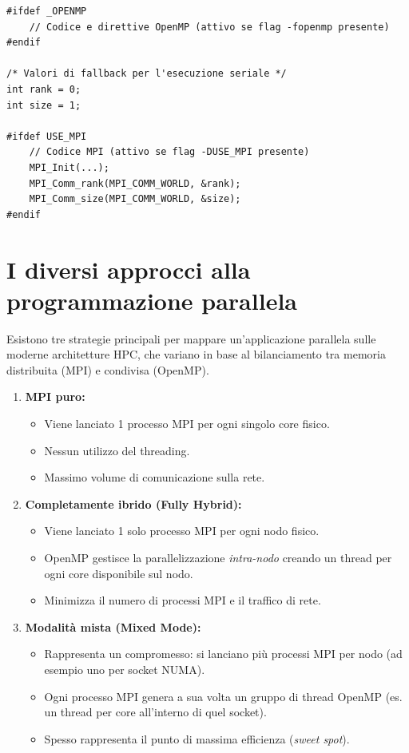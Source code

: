 \begin{verbatim}
#ifdef _OPENMP
    // Codice e direttive OpenMP (attivo se flag -fopenmp presente)
#endif

/* Valori di fallback per l'esecuzione seriale */
int rank = 0;
int size = 1;

#ifdef USE_MPI
    // Codice MPI (attivo se flag -DUSE_MPI presente)
    MPI_Init(...);
    MPI_Comm_rank(MPI_COMM_WORLD, &rank);
    MPI_Comm_size(MPI_COMM_WORLD, &size);
#endif
\end{verbatim}

\section*{I diversi approcci alla programmazione parallela}

Esistono tre strategie principali per mappare un'applicazione parallela sulle moderne architetture HPC, che variano in base al bilanciamento tra memoria distribuita (MPI) e condivisa (OpenMP).

\begin{enumerate}
    \item \textbf{MPI puro:} 
    \begin{itemize}
        \item Viene lanciato 1 processo MPI per ogni singolo core fisico.
        \item Nessun utilizzo del threading.
        \item Massimo volume di comunicazione sulla rete.
    \end{itemize}
    
    \item \textbf{Completamente ibrido (Fully Hybrid):} 
    \begin{itemize}
        \item Viene lanciato 1 solo processo MPI per ogni nodo fisico.
        \item OpenMP gestisce la parallelizzazione \textit{intra-nodo} creando un thread per ogni core disponibile sul nodo.
        \item Minimizza il numero di processi MPI e il traffico di rete.
    \end{itemize}
    
    \item \textbf{Modalità mista (Mixed Mode):} 
    \begin{itemize}
        \item Rappresenta un compromesso: si lanciano più processi MPI per nodo (ad esempio uno per socket NUMA).
        \item Ogni processo MPI genera a sua volta un gruppo di thread OpenMP (es. un thread per core all'interno di quel socket).
        \item Spesso rappresenta il punto di massima efficienza (\textit{sweet spot}).
    \end{itemize}
\end{enumerate}

